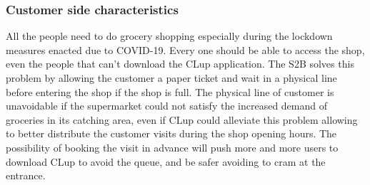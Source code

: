     \subsubsection{Customer side characteristics}
    All the people need to do grocery shopping especially during the lockdown measures enacted due to COVID-19. 
    Every one should be able to access the shop, even the people that can't download the CLup application.
    The S2B solves this problem by allowing the customer a paper ticket and wait in a physical line before entering the shop if the shop is full.
    The physical line of customer is unavoidable if the supermarket could not satisfy the increased demand of groceries in its catching area, even if CLup could alleviate this problem allowing to better distribute the customer visits during the shop opening hours. The possibility of booking the visit in advance will push more and more users to download CLup to avoid the queue, and be safer avoiding to cram at the entrance.


